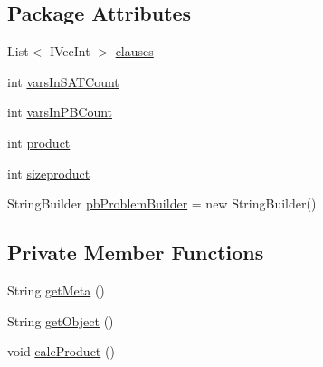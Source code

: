 \subsection*{Package Attributes}
\begin{DoxyCompactItemize}
\item 
List$<$ IVecInt $>$ \hyperlink{classedu_1_1pku_1_1id_1_1mus_1_1_s_a_t2_p_b_translater___q_c_a3b2a0756c6d32ae774de4199a892e219}{clauses}
\item 
int \hyperlink{classedu_1_1pku_1_1id_1_1mus_1_1_s_a_t2_p_b_translater___q_c_a7fe2d4c8a7d85ea657476012e0d321e4}{varsInSATCount}
\item 
int \hyperlink{classedu_1_1pku_1_1id_1_1mus_1_1_s_a_t2_p_b_translater___q_c_a8abe437a89e7531652de4e348dfd7f40}{varsInPBCount}
\item 
int \hyperlink{classedu_1_1pku_1_1id_1_1mus_1_1_s_a_t2_p_b_translater___q_c_a2356d55231e76907d045df743f3e6d1a}{product}
\item 
int \hyperlink{classedu_1_1pku_1_1id_1_1mus_1_1_s_a_t2_p_b_translater___q_c_a5b31ab15369776a832cf92570bebee16}{sizeproduct}
\item 
StringBuilder \hyperlink{classedu_1_1pku_1_1id_1_1mus_1_1_s_a_t2_p_b_translater___q_c_abbe849be65a6af1449c761f72554b5f5}{pbProblemBuilder} = new StringBuilder()
\end{DoxyCompactItemize}
\subsection*{Private Member Functions}
\begin{DoxyCompactItemize}
\item 
String \hyperlink{classedu_1_1pku_1_1id_1_1mus_1_1_s_a_t2_p_b_translater___q_c_aecc21a323ca13cedf89bd9fba3d601f2}{getMeta} ()
\item 
String \hyperlink{classedu_1_1pku_1_1id_1_1mus_1_1_s_a_t2_p_b_translater___q_c_a98c21a4df00476db05ddaa32fcf018b7}{getObject} ()
\item 
void \hyperlink{classedu_1_1pku_1_1id_1_1mus_1_1_s_a_t2_p_b_translater___q_c_a249fbf39a451e9fbc3152aaa5e1bbfef}{calcProduct} ()
\end{DoxyCompactItemize}


